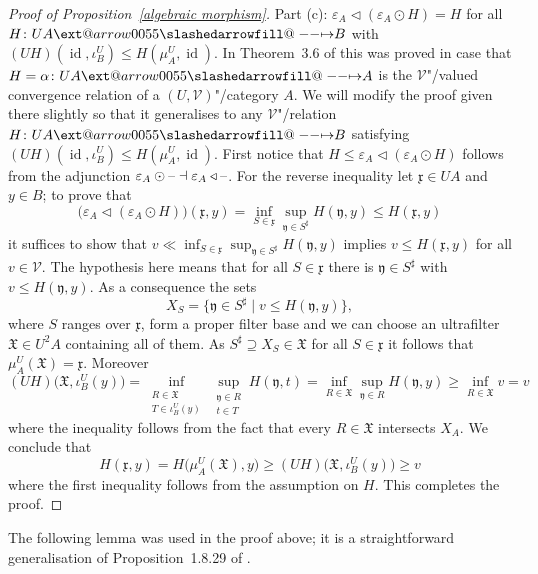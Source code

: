 \documentclass[preprint, a4paper]{elsarticle}
\makeatletter
\def\slashedarrowfill@#1#2#3#4#5{%
  $\m@th\thickmuskip0mu\medmuskip\thickmuskip\thinmuskip\thickmuskip
   \relax#5#1\mkern-7mu%
   \cleaders\hbox{$#5\mkern-2mu#2\mkern-2mu$}\hfill
   \mathclap{#3}\mathclap{#2}%
   \cleaders\hbox{$#5\mkern-2mu#2\mkern-2mu$}\hfill
   \mkern-7mu#4$%
}
\def\rightslashedarrowfill@{%
  \slashedarrowfill@\relbar\relbar\mapstochar\rightarrow}
\newcommand\xslashedrightarrow[2][]{%
  \ext@arrow 0055{\rightslashedarrowfill@}{#1}{#2}}
\def\slashedrightarrow{\xslashedrightarrow{}}
\theoremstyle{definition}
\theoremstyle{remark}
\providecommand{\propref}[1]{Proposition~\ref{#1}}
\providecommand{\eps}{\varepsilon}
\newcommand{\dash}{\textup{--}}
\providecommand{\mf}[1]{\mathfrak{#1}}
\providecommand{\brcs}[1]{\lbrace #1 \rbrace}
\providecommand{\bigpars}[1]{\bigl(#1\bigr)}
\providecommand{\set}[1]{\brcs{#1}}
\providecommand{\hmap}[3]{#1\colon#2\slashedrightarrow#3}
\DeclareMathOperator{\id}{id}
\providecommand{\ladj}{\dashv}
\providecommand{\catvar}[1]{\mathcal{#1}}
\providecommand{\2}{\mathsf 2}
\providecommand{\V}{\catvar V}
\providecommand{\hc}{\odot}
\providecommand{\lhom}{\triangleleft}
\makeatother
\begin{document}
\begin{proof}[Proof of \propref{algebraic morphism}]
		Part (c): $\eps_A \lhom (\eps_A \hc H) = H$ for all $\hmap H{UA}B$ with $(UH)(\id, \iota^U_B) \leq H(\mu_A^U, \id)$. In Theorem~3.6 of \cite{Lai-Tholen17a} this was proved in case that $\hmap{H = \alpha}{UA}A$ is the $\V$"/valued convergence relation of a $(U, \V)$"/category $A$. We will modify the proof given there slightly so that it generalises to any $\V$"/relation $\hmap H{UA}B$ satisfying $(UH)(\id, \iota^U_B) \leq H(\mu_A^U, \id)$. First notice that $H \leq \eps_A \lhom (\eps_A \hc H)$ follows from the adjunction $\eps_A \hc \dash \ladj \eps_A \lhom \dash$. For the reverse inequality let $\mf x \in UA$ and $y \in B$; to prove that
		\begin{displaymath}
			\bigpars{\eps_A \lhom (\eps_A \hc H)}(\mf x, y) = \inf_{S \in \mf x} \sup_{\mf y \in S^\sharp} H(\mf y, y) \leq H(\mf x, y)
		\end{displaymath}
		it suffices to show that $v \ll \inf_{S \in \mf x} \sup_{\mf y \in S^\sharp} H(\mf y, y)$ implies $v \leq H(\mf x, y)$ for all $v \in \V$. The hypothesis here means that for all $S \in \mf x$ there is $\mf y \in S^\sharp$ with $v \leq H(\mf y, y)$. As a consequence the sets
		\begin{displaymath}
			X_S = \set{\mf y \in S^\sharp \mid v \leq H(\mf y, y)},
		\end{displaymath}
		where $S$ ranges over $\mf x$, form a proper filter base and we can choose an ultrafilter $\mf X \in U^2A$ containing all of them. As $S^\sharp \supseteq X_S \in \mf X$ for all $S \in \mf x$ it follows that $\mu_A^U(\mf X) = \mf x$. Moreover
		\begin{displaymath}
			(UH)\bigpars{\mf X, \iota^U_B(y)} = \inf_{\substack{R \in \mf X\\T \in \iota_B^U(y)}} \sup_{\substack{\mf y \in R\\t \in T}} H(\mf y, t) = \inf_{R \in \mf X} \sup_{\mf y \in R} H(\mf y, y) \geq \inf_{R \in \mf X} v = v
		\end{displaymath}
		where the inequality follows from the fact that every $R \in \mf X$ intersects $X_A$. We conclude that
		\begin{displaymath}
			H(\mf x, y) = H\bigpars{\mu_A^U(\mf X), y} \geq (UH)\bigpars{\mf X, \iota_B^U(y)} \geq v
		\end{displaymath}
		where the first inequality follows from the assumption on $H$. This completes the proof.
	\end{proof}
	The following lemma was used in the proof above; it is a straightforward generalisation of Proposition~1.8.29 of \cite{Lowen97}.
\end{document}
